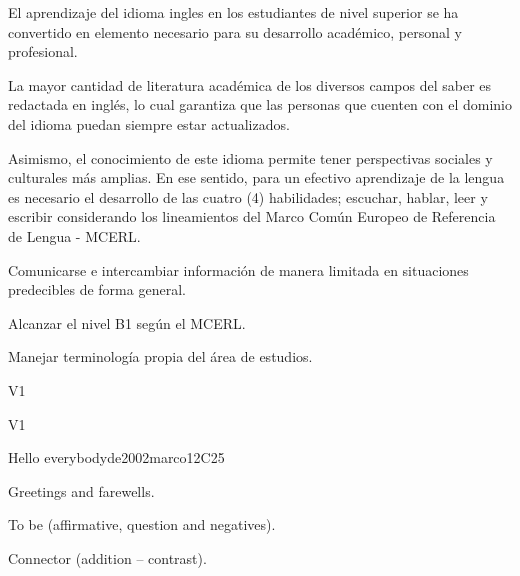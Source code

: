 \begin{syllabus}


\begin{justification}
El aprendizaje del idioma ingles en los estudiantes de nivel superior se ha 
convertido en elemento necesario para su desarrollo académico, personal y 
profesional. 

La mayor cantidad de literatura académica de los diversos campos del 
saber es redactada en inglés, lo cual garantiza que las personas que cuenten 
con el dominio del idioma puedan siempre estar actualizados. 

Asimismo, el conocimiento de este idioma permite tener perspectivas 
sociales y culturales más amplias. En ese sentido, para un efectivo 
aprendizaje de la lengua es necesario el desarrollo de 
las cuatro (4) habilidades; escuchar, hablar, leer y escribir 
considerando los lineamientos del 
Marco Común Europeo de Referencia de Lengua - MCERL.
\end{justification}

\begin{goals}
\item Comunicarse e intercambiar información de manera limitada en situaciones predecibles de forma general.
\item Alcanzar el nivel B1 según el MCERL.
\item Manejar terminología propia del área de estudios.
\end{goals}

\begin{outcomes}{V1}
\item {}
\end{outcomes}

\begin{competences}{V1}
    \item {}
\end{competences}

\begin{unit}{Hello everybody}{}{de2002marco}{12}{C25}
   \begin{topics}
      \item Greetings and farewells.
      \item To be (affirmative, question and negatives).
      \item Connector (addition – contrast).
   \end{topics}


\end{unit}
\end{syllabus}
